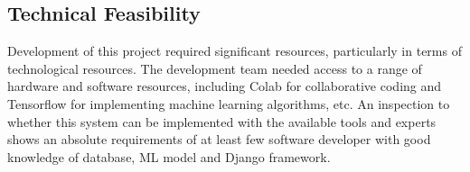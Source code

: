 \newpage
\subsection{Technical Feasibility}
Development of this project required significant resources, particularly in terms of technological resources. The development team needed access to a range of hardware
and software resources, including Colab for collaborative coding and Tensorflow for implementing machine learning algorithms, etc. An inspection to
whether this system can be implemented with the available tools and experts shows an absolute requirements of at least few software developer with good knowledge of database, ML model and Django framework.